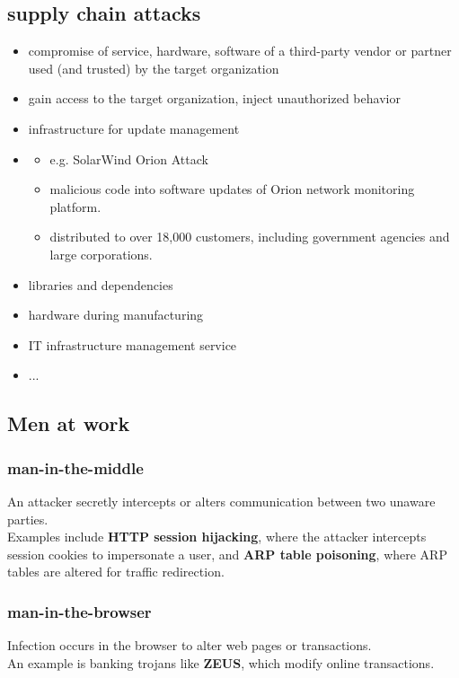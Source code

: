 \subsection{supply chain attacks}
\begin{itemize}[itemsep=0pt, topsep=0pt]
  \item compromise of service, hardware, software of a third-party vendor or partner used (and trusted) by the target organization
  \item gain access to the target organization, inject unauthorized behavior
  \item infrastructure for update management
  \item
    \begin{itemize}[itemsep=0pt, topsep=0pt]
      \item e.g. SolarWind Orion Attack
      \item malicious code into software updates of Orion network monitoring platform.
      \item distributed to over 18,000 customers, including government agencies and large corporations.
    \end{itemize}
  \item libraries and dependencies
  \item hardware during manufacturing
  \item IT infrastructure management service
  \item ...
\end{itemize}
\subsection{Men at work} \label{sec:Mitx}

\subsubsection{man-in-the-middle}
An attacker secretly intercepts or alters communication between two unaware parties. \\Examples include \textbf{HTTP session hijacking}, where the attacker intercepts session cookies to impersonate a user, and \textbf{ARP table poisoning}, where ARP tables are altered for traffic redirection.

\subsubsection{man-in-the-browser}
Infection occurs in the browser to alter web pages or transactions.\\ An example is banking trojans like \textbf{ZEUS}, which modify online transactions.

